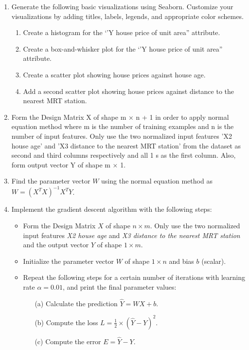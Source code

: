 \begin{enumerate}
\begin{enumerate}
    \end{enumerate}
    \item Generate the following basic visualizations using Seaborn. Customize your visualizations by adding titles, labels, legends, and appropriate color schemes.
    \begin{enumerate}
        \item Create a histogram for the ‘’Y house price of unit area” attribute.
        \item Create a box-and-whisker plot for the ‘’Y house price of unit area” attribute.
        \item  Create a scatter plot showing house prices against house age.
        \item Add a second scatter plot showing house prices against distance to the nearest MRT station.
    \end{enumerate}
    \item Form the Design Matrix X of shape m × n + 1 in order to apply normal equation
method where m is the number of training examples and n is the number of input
features. Only use the two normalized input features ’X2 house age’ and ’X3 distance to the nearest MRT station’ from the dataset as second and third columns respectively and all 1 s as the first column. Also, form output vector Y of shape m × 1.
   \item Find the parameter vector \( W \) using the normal equation method as \( W = (X^T X)^{-1} X^T Y \).
    \item Implement the gradient descent algorithm with the following steps:
    \begin{itemize}
    \item Form the Design Matrix \( X \) of shape \( n \times m \). Only use the two normalized input features \textit{X2 house age} and \textit{X3 distance to the nearest MRT station} and the output vector \( Y \) of shape \( 1 \times m \).
    \item Initialize the parameter vector \( W \) of shape \( 1 \times n \) and bias \( b \) (scalar).
    \item Repeat the following steps for a certain number of iterations with learning rate \( \alpha = 0.01 \), and print the final parameter values:
    \begin{itemize}
        \item[(a)] Calculate the prediction \( \hat{Y} = WX + b \).
        \item[(b)] Compute the loss \( L = \frac{1}{2} \times (\hat{Y} - Y)^2 \).
        \item[(c)] Compute the error \( E = \hat{Y} - Y \).

\end{itemize}
\end{itemize}
\end{enumerate}
